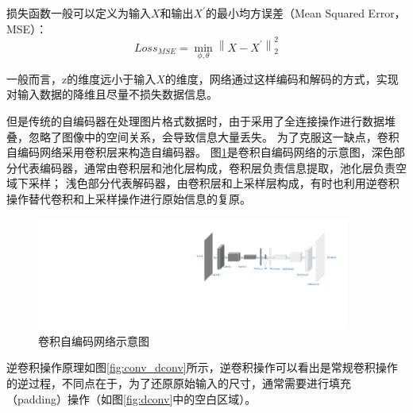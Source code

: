 损失函数一般可以定义为输入$X$和输出$X^{\prime}$的最小均方误差（Mean Squared Error，MSE）：
\begin{equation}
Loss_{MSE} = \min _{\phi, \theta}\left\|X-X^{\prime}\right\|_{2}^{2}
\end{equation}

一般而言，z的维度远小于输入$X$的维度，网络通过这样编码和解码的方式，实现对输入数据的降维且尽量不损失数据信息。

但是传统的自编码器在处理图片格式数据时，由于采用了全连接操作进行数据堆叠，忽略了图像中的空间关系，会导致信息大量丢失。
为了克服这一缺点，卷积自编码网络采用卷积层来构造自编码器。
图\ref{fig:CAE}是卷积自编码网络的示意图，深色部分代表编码器，通常由卷积层和池化层构成，卷积层负责信息提取，池化层负责空域下采样；
浅色部分代表解码器，由卷积层和上采样层构成，有时也利用逆卷积操作替代卷积和上采样操作进行原始信息的复原。

\begin{figure}[htp]
	\centering
	\includegraphics[width=0.92\textwidth]{figures/CAE.pdf}
	\caption{卷积自编码网络示意图}
	\label{fig:CAE}
\end{figure}

逆卷积操作原理如图\ref{fig:conv_dconv}所示，逆卷积操作可以看出是常规卷积操作的逆过程，不同点在于，为了还原原始输入的尺寸，通常需要进行填充（padding）操作（如图\ref{fig:dconv}中的空白区域）。


